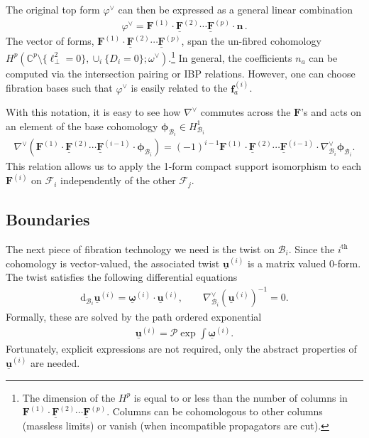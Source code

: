 \documentclass[11pt]{article}
\renewcommand{\d}{\text{d}}
\newcommand{\F}{\mathcal{F}}
\newcommand{\B}{\mathcal{B}}
\newcommand{\vphi}{\varphi}
\newcommand{\bs}[1]{\boldsymbol{#1}}
\newcommand{\mat}[1]{\underline{\boldsymbol{#1}}}
\begin{document}
The original top form $\vphi^\vee$ can then be expressed as a general linear combination
\begin{align}
	\vphi^\vee 
	= \bs{F}^{(1)} \cdot \underline{\bs{F}}^{(2)} \cdots 
	\underline{\bs{F}}^{(p)} \cdot \bs{n}\,.
\end{align}
The vector of forms, $\bs{F}^{(1)} \cdot \underline{\bs{F}}^{(2)} \cdots \underline{\bs{F}}^{(p)}$, span the un-fibred cohomology $H^p(\mathbb{C}^p\setminus\{\ell_\perp^2=0\}, \cup_i \{D_i=0\};\omega^\vee)$.\footnote{The dimension of the $H^p$ is equal to or less than the number of columns in $\bs{F}^{(1)} \cdot \underline{\bs{F}}^{(2)} \cdots \underline{\bs{F}}^{(p)}$. Columns can be cohomologous to other columns (massless limits) or vanish (when incompatible propagators are cut).}
In general, the coefficients $n_{a}$ can be computed via the intersection pairing or IBP relations. However, one can choose fibration bases such that $\vphi^\vee$ is easily related to the $\bs{f}^{(i)}_a$.

With this notation, it is easy to see how $\nabla^\vee$ commutes across the $\bs{F}$'s and acts on an element of the base cohomology $\bs{\phi}_{\B_i} \in H_{\B_i}^1$
\begin{align}
	\nabla^\vee ( \bs{F}^{(1)} \cdot \underline{\bs{F}}^{(2)} \cdots \underline{\bs{F}}^{(i-1)} \cdot \bs{\phi}_{\B_i} )
	= (-1)^{i-1} \bs{F}^{(1)} \cdot \underline{\bs{F}}^{(2)} \cdots \underline{\bs{F}}^{(i-1)} \cdot \nabla_{\B_i}^\vee \bs{\phi}_{\B_i}.
\end{align}
This relation allows us to apply the 1-form compact support isomorphism to each $\bs{F}^{(i)}$ on $\F_i$ independently of the other $\F_j$.

\subsection{Boundaries}

The next piece of fibration technology we need is the twist on $\B_i$. Since the $i^\text{th}$ cohomology is vector-valued, the associated twist $\mat{u}^{(i)}$ is a matrix valued 0-form. The twist satisfies the following differential equations
\begin{align}
	\d_{\B_i} \mat{u}^{(i)} = \mat{\omega}^{(i)} \cdot \mat{u}^{(i)},
	\qquad
	\nabla^\vee_{\B_i} \left(\mat{u}^{(i)}\right)^{-1} = 0.
\end{align}
Formally, these are solved by the path ordered exponential
\begin{align}
	\mat{u}^{(i)} 
	= \mathcal{P} \exp \int \mat{\omega}^{(i)}. 
\end{align}
Fortunately, explicit expressions are not required, only the abstract properties of $\mat{u}^{(i)}$ are needed.
\end{document}

